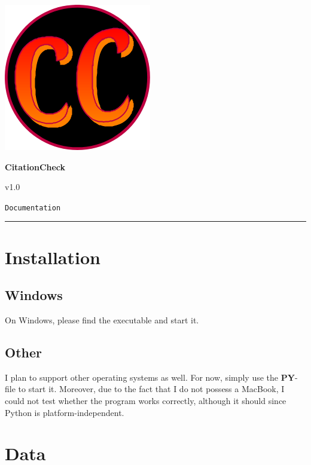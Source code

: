 \documentclass[11pt]{article}
\begin{document}
    \begin{center}
        \includegraphics[scale=0.5]{../assets/logo.png}\vspace{5mm}

        {\Huge \textbf{CitationCheck}}\vspace{2mm}

        {\Large v1.0}\vspace{2mm}

        {\Large \texttt{Documentation}}
    \end{center}
    \hrule \vspace{10mm}

    \section{Installation}

        \subsection{Windows}

        On Windows, please find the executable and start it.
    
        \subsection{Other}

        I plan to support other operating systems as well. For now, simply use the \textbf{PY}-file to start it. Moreover, 
        due to the fact that I do not possess a MacBook, I could not test whether the program works correctly, although it should since Python is platform-independent.

    \section{Data}
\end{document}
